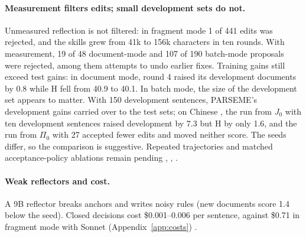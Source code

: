\paragraph{Measurement filters edits; small development sets do not.}
Unmeasured reflection is not filtered: in fragment mode 1 of 441 edits was rejected, and the skills grew from 41k to 156k characters in ten rounds. With measurement, 19 of 48 document-mode and 107 of 190 batch-mode proposals were rejected, among them attempts to undo earlier fixes. Training gains still exceed test gains: in document mode, round 4 raised its development documents by 0.8 \F while H fell from 40.9 to 40.1. In batch mode, the size of the development set appears to matter. With 150 development sentences, PARSEME's development gains carried over to the test sets; on Chinese \umr, the run from $J_0$ with ten development sentences raised development \F by 7.3 but H by only 1.6, and the run from $\Pi_0$ with 27 accepted fewer edits and moved neither score. The seeds differ, so the comparison is suggestive. Repeated trajectories and matched acceptance-policy ablations remain pending , , .

\paragraph{Weak reflectors and cost.}
A 9B reflector breaks anchors and writes noisy rules (new documents score 1.4 \F below the seed). Closed decisions cost \$0.001--0.006 per \umr sentence, against \$0.71 in fragment mode with Sonnet (Appendix~\ref{app:costs}) .
